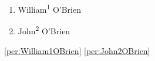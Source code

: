 
\begin{enumerate}
	\item \label{per:William1OBrien} William\textsuperscript{1} O'Brien
	\item \label{per:John2OBrien} John\textsuperscript{2} O'Brien
\end{enumerate}

\ref{per:William1OBrien}
\ref{per:John2OBrien}